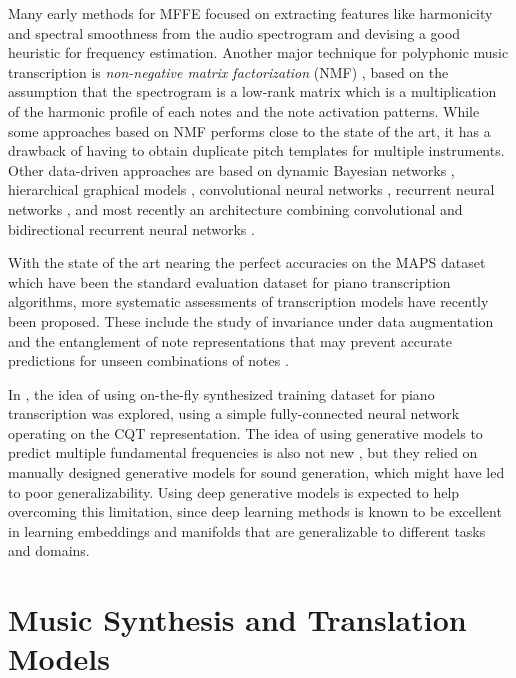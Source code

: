 Many early methods for MFFE \cite{klapuri2003multiple} focused on extracting features like harmonicity and spectral smoothness from the audio spectrogram and devising a good heuristic for frequency estimation.
Another major technique for polyphonic music transcription is \emph{non-negative matrix factorization} (NMF) \cite{lee2001nmf}, based on the assumption that the spectrogram is a low-rank matrix which is a multiplication of the harmonic profile of each notes and the note activation patterns.
While some approaches \cite{gao2017nmf} based on NMF performs close to the state of the art, it has a drawback of having to obtain duplicate pitch templates for multiple instruments.
Other data-driven approaches are based on dynamic Bayesian networks \cite{raczynski2013dynamic}, hierarchical graphical models \cite{pesek2017hierarchical}, convolutional neural networks \cite{bittner2017deepsalience}, recurrent neural networks \cite{bock2012rnn,sigtia2016endtoend}, and most recently an architecture combining convolutional and bidirectional recurrent neural networks \cite{hawthorne2018piano}.

With the state of the art nearing the perfect accuracies \cite{ewert2017transcription} on the MAPS dataset \cite{emiya2010multipitch} which have been the standard evaluation dataset for piano transcription algorithms, more systematic assessments of transcription models have recently been proposed.
These include the study of invariance under data augmentation \cite{thickstun2017invariances} and the entanglement of note representations that may prevent accurate predictions for unseen combinations of notes \cite{kelz2017entanglement}.

In \cite{li2017infinite}, the idea of using on-the-fly synthesized training dataset for piano transcription was explored, using a simple fully-connected neural network operating on the CQT representation.
The idea of using generative models to predict multiple fundamental frequencies is also not new \cite{dubois2005harmonic,cemgil2006generative}, but they relied on manually designed generative models for sound generation, which might have led to poor generalizability.
Using deep generative models is expected to help overcoming this limitation, since deep learning methods is known to be excellent in learning embeddings and manifolds that are generalizable to different tasks and domains.


\section{Music Synthesis and Translation Models}

